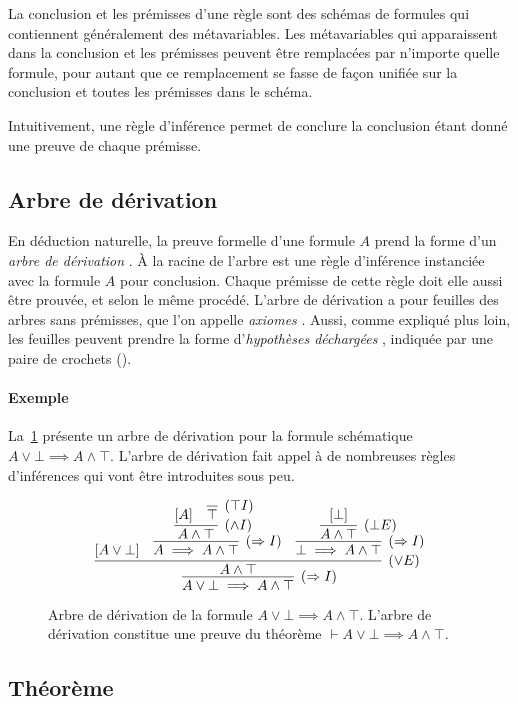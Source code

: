 La conclusion et les prémisses d'une règle sont des schémas de formules qui contiennent généralement des métavariables.
Les métavariables qui apparaissent dans la conclusion et les prémisses peuvent être remplacées par n'importe quelle formule, pour autant que ce remplacement se fasse de façon unifiée sur la conclusion et toutes les prémisses dans le schéma.

Intuitivement, une règle d'inférence permet de conclure la conclusion étant donné une preuve de chaque prémisse.

\subsection{Arbre de dérivation}

En déduction naturelle, la preuve formelle d'une formule $A$ prend la forme d'un \og \textit{arbre de dérivation} \fg.
À la racine de l'arbre est une règle d'inférence instanciée avec la formule $A$ pour conclusion.
Chaque prémisse de cette règle doit elle aussi être prouvée, et selon le même procédé.
L'arbre de dérivation a pour feuilles des arbres sans prémisses, que l'on appelle \og \textit{axiomes} \fg{}.
Aussi, comme expliqué plus loin, les feuilles peuvent prendre la forme d'\og \textit{hypothèses déchargées} \fg{}, indiquée par une paire de crochets (\og [ \fg{} et \og ] \fg{}).

\paragraph{Exemple} La~\cref{fig_arbre_derivation} présente un arbre de dérivation pour la formule schématique $A \vee \bot \implies A \wedge \top$. L'arbre de dérivation fait appel à de nombreuses règles d'inférences qui vont être introduites sous peu.

\begin{figure}[h]
\[
\infer[({\Rightarrow{}}I)]{A \vee \bot \implies A \wedge \top}{%
\infer[({\vee}E)]{A \wedge \top}{[A \vee \bot] &%
\infer[({\Rightarrow{}}I)]{A \implies A \wedge \top}{%
\infer[({\wedge{}}I)]{A \wedge \top}{[A] & \infer[({\top}I)]{\top}{}}} &%
\infer[({\Rightarrow{}}I)]{\bot \implies A \wedge \top}{%
\infer[({\bot}E)]{A \wedge \top}{[\bot]}}}}
\]
\caption{Arbre de dérivation de la formule $A \vee \bot \implies A \wedge \top$. L'arbre de dérivation constitue une preuve du théorème $\vdash A \vee \bot \implies A \wedge \top$.}
\label{fig_arbre_derivation}
\end{figure}

\subsection{Théorème}

